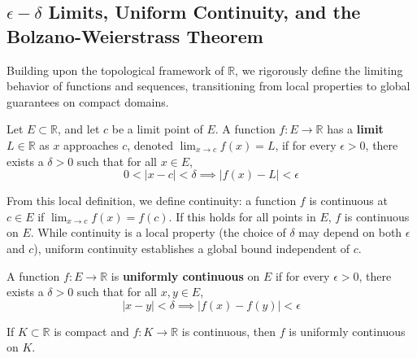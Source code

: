 \subsection{$\epsilon-\delta$ Limits, Uniform Continuity, and the Bolzano-Weierstrass Theorem}

Building upon the topological framework of $\mathbb{R}$, we rigorously define the limiting behavior of functions and sequences, transitioning from local properties to global guarantees on compact domains.

\begin{definition}
Let $E \subset \mathbb{R}$, and let $c$ be a limit point of $E$. A function $f: E \to \mathbb{R}$ has a \textbf{limit} $L \in \mathbb{R}$ as $x$ approaches $c$, denoted $\lim_{x \to c} f(x) = L$, if for every $\epsilon > 0$, there exists a $\delta > 0$ such that for all $x \in E$,
\[
0 < |x - c| < \delta \implies |f(x) - L| < \epsilon
\]
\end{definition}

From this local definition, we define continuity: a function $f$ is continuous at $c \in E$ if $\lim_{x \to c} f(x) = f(c)$. If this holds for all points in $E$, $f$ is continuous on $E$. While continuity is a local property (the choice of $\delta$ may depend on both $\epsilon$ and $c$), uniform continuity establishes a global bound independent of $c$.

\begin{definition}
A function $f: E \to \mathbb{R}$ is \textbf{uniformly continuous} on $E$ if for every $\epsilon > 0$, there exists a $\delta > 0$ such that for all $x, y \in E$,
\[
|x - y| < \delta \implies |f(x) - f(y)| < \epsilon
\]
\end{definition}

\begin{theorem}
If $K \subset \mathbb{R}$ is compact and $f: K \to \mathbb{R}$ is continuous, then $f$ is uniformly continuous on $K$.
\end{theorem}

